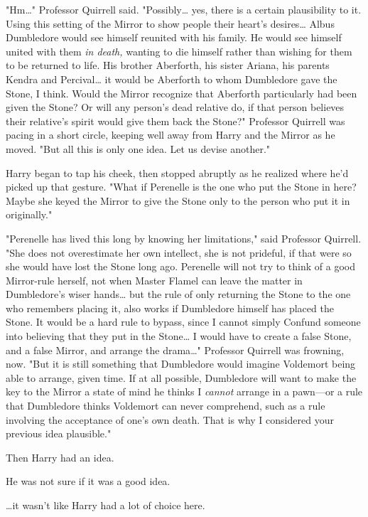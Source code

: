 "Hm{\ldots}" Professor Quirrell said. "Possibly{\ldots} yes, there is a certain
plausibility to it. Using this setting of the Mirror to show people their
heart's desires{\ldots} Albus Dumbledore would see himself reunited with his
family. He would see himself united with them \emph{in death,} wanting to die
himself rather than wishing for them to be returned to life. His brother
Aberforth, his sister Ariana, his parents Kendra and Percival{\ldots} it would
be Aberforth to whom Dumbledore gave the Stone, I think. Would the Mirror
recognize that Aberforth particularly had been given the Stone? Or will any
person's dead relative do, if that person believes their relative's spirit
would give them back the Stone?" Professor Quirrell was pacing in a short
circle, keeping well away from Harry and the Mirror as he moved. "But all this
is only one idea. Let us devise another."

Harry began to tap his cheek, then stopped abruptly as he realized where he'd
picked up that gesture. "What if Perenelle is the one who put the Stone in
here? Maybe she keyed the Mirror to give the Stone only to the person who put
it in originally."

"Perenelle has lived this long by knowing her limitations," said Professor
Quirrell. "She does not overestimate her own intellect, she is not prideful, if
that were so she would have lost the Stone long ago. Perenelle will not try to
think of a good Mirror-rule herself, not when Master Flamel can leave the
matter in Dumbledore's wiser hands{\ldots} but the rule of only returning the
Stone to the one who remembers placing it, also works if Dumbledore himself has
placed the Stone. It would be a hard rule to bypass, since I cannot simply
Confund someone into believing that they put in the Stone{\ldots} I would have
to create a false Stone, and a false Mirror, and arrange the drama{\ldots}"
Professor Quirrell was frowning, now. "But it is still something that
Dumbledore would imagine Voldemort being able to arrange, given time. If at all
possible, Dumbledore will want to make the key to the Mirror a state of mind he
thinks I \emph{cannot} arrange in a pawn---or a rule that Dumbledore thinks
Voldemort can never comprehend, such as a rule involving the acceptance of
one's own death. That is why I considered your previous idea plausible."

Then Harry had an idea.

He was not sure if it was a good idea.

{\ldots}it wasn't like Harry had a lot of choice here.

